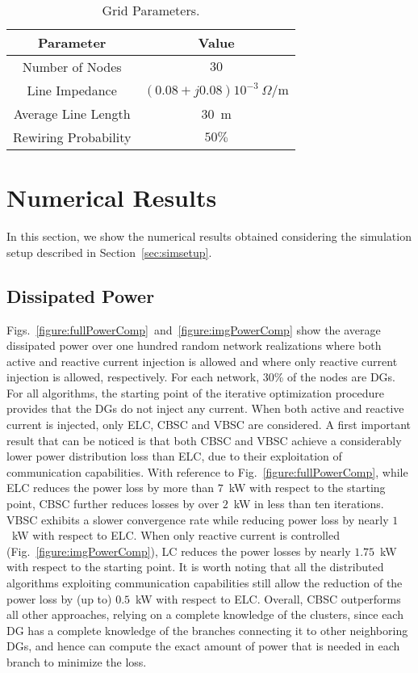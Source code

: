 \documentclass[journal]{IEEEtran}
\newcommand{\fig}[1]{Fig.~\ref{#1}}
\newcommand{\figs}[2]{Figs.~\ref{#1}~and~\ref{#2}}
\newcommand{\secref}[1]{Section~\ref{#1}}
\begin{document}
\begin{table}[ht]
\centering
\caption{Grid Parameters.}\label{table:varyingpars}
\begin{tabular}{|c|c|}
\hline
\textbf{Parameter}&\textbf{Value}\\
\hline
Number of Nodes & $30$ \\
\hline
Line Impedance & $(0.08+j0.08)10^{-3}\ \Omega/\text{m}$\\
\hline
Average Line Length & $30$~m\\
\hline
Rewiring Probability & $50\%$\\
\hline
\end{tabular}
\end{table}





\section{Numerical Results}
\label{sec:results}

In this section, we show the numerical results obtained considering the simulation setup described in \secref{sec:simsetup}.

\subsection{Dissipated Power}
\label{ssec:algoComparison}

\figs{figure:fullPowerComp}{figure:imgPowerComp} show the average dissipated power over one hundred random network realizations where both active and reactive current injection is allowed and where only reactive current injection is allowed, respectively. For each network, $30$\% of the nodes are DGs. For all algorithms, the starting point of the iterative optimization procedure provides that the DGs do not inject any current. When both active and reactive current is injected, only ELC, CBSC and VBSC are considered. A first important result that can be noticed is that both CBSC and VBSC achieve a considerably lower power distribution loss than ELC, due to their exploitation of communication capabilities. With reference to \fig{figure:fullPowerComp}, while ELC reduces the power loss by more than $7$~kW with respect to the starting point, CBSC further reduces losses by over $2$~kW in less than ten iterations. VBSC exhibits a slower convergence rate while reducing power loss by nearly $1$~kW with respect to ELC. When only reactive current is controlled (\fig{figure:imgPowerComp}), LC reduces the power losses by nearly $1.75$~kW with respect to the starting point. It is worth noting that all the distributed algorithms exploiting communication capabilities still allow the reduction of the power loss by (up to) $0.5$~kW with respect to ELC. Overall, CBSC outperforms all other approaches, relying on a complete knowledge of the clusters, since each DG has a complete knowledge of the branches connecting it to other neighboring DGs, and hence can compute the exact amount of power that is needed in each branch to minimize the loss.
\end{document}
